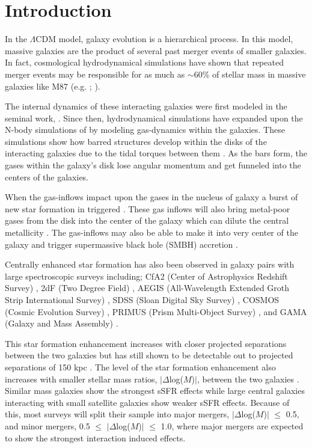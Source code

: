 \documentclass[iop,revtex4,twocolumn,apj,numberedappendix,appendixfloats]{emulateapj}
\begin{document}
\section{Introduction}\label{sec:intro}

In the $\Lambda$CDM model, galaxy evolution is a hierarchical process. In this model, massive galaxies are the product of several past merger events of smaller galaxies. In fact, cosmological hydrodynamical simulations have shown that repeated merger events may be responsible for as much as $\sim$60\% of stellar mass in massive galaxies like M87 (e.g. \citet{Rodriguez-Gomez:2016}; \citet{Pillepich:2018}). 

The internal dynamics of these interacting galaxies were first modeled in the seminal work, \citet{Toomre:1972}. Since then, hydrodynamical simulations have expanded upon the N-body simulations of \citet{Toomre:1972} by modeling gas-dynamics within the galaxies. These simulations show how barred structures develop within the disks of the interacting galaxies due to the tidal torques between them \citep{Barnes:1991}. As the bars form, the gases within the galaxy's disk lose angular momentum and get funneled into the centers of the galaxies. 

When the gas-inflows impact upon the gases in the nucleus of galaxy a burst of new star formation in triggered \citep{Barnes:1996, Mihos:1996}. These gas inflows will also bring metal-poor gases from the disk into the center of the galaxy which can dilute the central metallicity \citep{Rupke:2010, Perez:2011, Scudder:2012}. The gas-inflows may also be able to make it into very center of the galaxy and trigger supermassive black hole (SMBH) accretion \citep{Capelo:2017}. 

Centrally enhanced star formation has also been observed in galaxy pairs with large spectroscopic surveys including; CfA2 (Center of Astrophysics Redshift Survey)  \citep{Barton:2000, Woods:2006}, 2dF (Two Degree Field) \citep{Lambas:2003}, AEGIS (All-Wavelength Extended Groth Strip International Survey) \citep{Lin:2007}, SDSS (Sloan Digital Sky Survey) \citep{Ellison:2008}, COSMOS (Cosmic Evolution Survey) \citep{Kartaltepe:2007,Xu:2012}, PRIMUS (Prism Multi-Object Survey) \citep{Wong:2011}, and GAMA (Galaxy and Mass Assembly) \citep{Robotham:2014}.

This star formation enhancement increases with closer projected separations between the two galaxies \citep{Li:2008, Ellison:2008, Scudder:2012} but has still shown to be detectable out to projected separations of 150 kpc \citep{Patton:2013}. The level of the star formation enhancement also increases with smaller stellar mass ratios, $|\Delta$log($M$)$|$, between the two galaxies \citep{Ellison:2008}. Similar mass galaxies show the strongest sSFR effects while large central galaxies interacting with small satellite galaxies show weaker sSFR effects. Because of this, most surveys will split their sample into major mergers, $|\Delta$log($M$)$|$ $\le$ 0.5, and minor mergers, 0.5 $\le$ $|\Delta$log($M$)$|$ $\le$ 1.0, where major mergers are expected to show the strongest interaction induced effects. 
\end{document}

